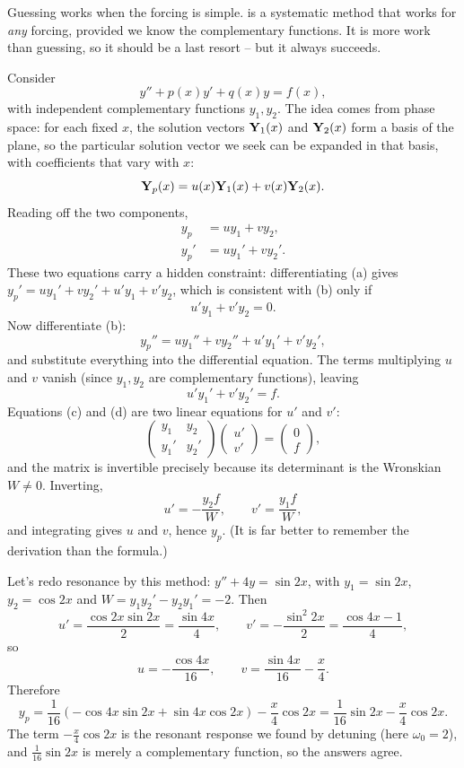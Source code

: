 \documentclass[a4paper]{scrartcl}
\begin{document}
Guessing works when the forcing is simple.  is a systematic method that works for \emph{any} forcing, provided we know the complementary functions. It is more work than guessing, so it should be a last resort -- but it always succeeds.

Consider
$$
y'' + p(x) y' + q(x) y = f(x),
$$
with independent complementary functions $y_1, y_2$. The idea comes from phase space: for each fixed $x$, the solution vectors $\mathbf{Y}_1(x)$ and $\mathbf{Y}_2(x)$ form a basis of the plane, so the particular solution vector we seek can be expanded in that basis, with coefficients that vary with $x$:
$$
\mathbf{Y}_p(x) = u(x) \mathbf{Y}_1(x) + v(x) \mathbf{Y}_2(x).
$$
Reading off the two components,
\begin{align}
	y_p &= u y_1 + v y_2, \tag{a} \\
	y_p' &= u y_1' + v y_2'. \tag{b}
\end{align}
These two equations carry a hidden constraint: differentiating (a) gives $y_p' = uy_1' + vy_2' + u'y_1 + v'y_2$, which is consistent with (b) only if
\begin{equation}
u' y_1 + v' y_2 = 0. \tag{c}
\end{equation}
Now differentiate (b):
$$
y_p'' = u y_1'' + v y_2'' + u' y_1' + v' y_2',
$$
and substitute everything into the differential equation. The terms multiplying $u$ and $v$ vanish (since $y_1, y_2$ are complementary functions), leaving
\begin{equation}
u' y_1' + v' y_2' = f. \tag{d}
\end{equation}
Equations (c) and (d) are two linear equations for $u'$ and $v'$:
$$
\begin{pmatrix} y_1 & y_2 \\ y_1' & y_2' \end{pmatrix}
\begin{pmatrix} u' \\ v' \end{pmatrix} = \begin{pmatrix} 0 \\ f \end{pmatrix},
$$
and the matrix is invertible precisely because its determinant is the Wronskian $W \neq 0$. Inverting,
$$
u' = -\frac{y_2 f}{W}, \qquad v' = \frac{y_1 f}{W},
$$
and integrating gives $u$ and $v$, hence $y_p$. (It is far better to remember the derivation than the formula.)

\begin{example}
	Let's redo resonance by this method: $y'' + 4y = \sin 2x$, with $y_1 = \sin 2x$, $y_2 = \cos 2x$ and $W = y_1y_2' - y_2 y_1' = -2$. Then
	$$
	u' = \frac{\cos 2x \sin 2x}{2} = \frac{\sin 4x}{4}, \qquad v' = -\frac{\sin^2 2x}{2} = \frac{\cos 4x - 1}{4},
	$$
	so
	$$
	u = -\frac{\cos 4x}{16}, \qquad v = \frac{\sin 4x}{16} - \frac{x}{4}.
	$$
	Therefore
	$$
	y_p = \frac{1}{16}\left(-\cos 4x \sin 2x + \sin 4x \cos 2x\right) - \frac{x}{4}\cos 2x = \frac{1}{16}\sin 2x - \frac{x}{4}\cos 2x.
	$$
	The term $-\frac{x}{4}\cos 2x$ is the resonant response we found by detuning (here $\omega_0 = 2$), and $\frac{1}{16}\sin 2x$ is merely a complementary function, so the answers agree.
\end{example}
\end{document}
